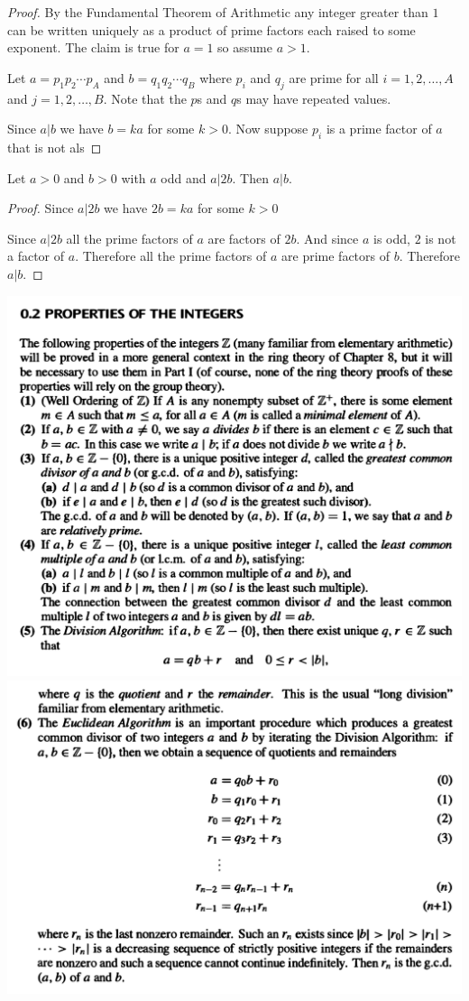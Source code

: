 \begin{proof}
  By the Fundamental Theorem of Arithmetic any integer greater than $1$ can be written uniquely as
  a product of prime factors each raised to some exponent. The claim is true for $a=1$ so
  assume $a > 1$.

  Let $a = p_1p_2\cdots p_A$ and $b = q_1q_2\cdots q_B$ where $p_i$ and $q_j$ are prime for all
  $i = 1,2,\ldots,A$ and $j =1,2,\ldots,B$. Note that the $p$s and $q$s may have repeated values.

  Since $a|b$ we have $b = ka$ for some $k > 0$. Now suppose $p_i$ is a prime factor of $a$ that is not als

\end{proof}


\begin{theorem*}
  Let $a > 0$ and $b > 0$ with $a$ odd and $a | 2b$. Then $a | b$.
\end{theorem*}

\begin{proof}

  Since $a|2b$ we have $2b = ka$ for some $k > 0$


  Since $a|2b$ all the prime factors of $a$ are factors of $2b$. And since $a$ is odd, $2$ is not a
  factor of $a$. Therefore all the prime factors of $a$ are prime factors of $b$. Therefore $a|b$.
\end{proof}



\begin{mdframed}
\includegraphics[width=400pt]{img/foundations--set-theory--number-theory-82fa.png}
\includegraphics[width=400pt]{img/foundations--set-theory--number-theory-179a.png}
\end{mdframed}
